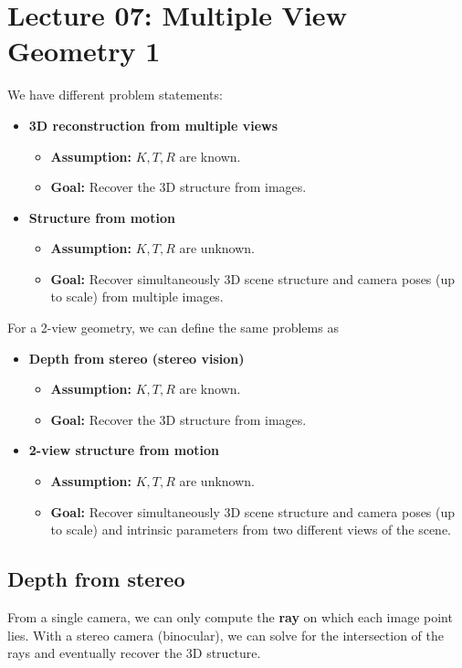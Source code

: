 \documentclass[a4paper,12 pt]{article}
\theoremstyle{definition}
\theoremstyle{remark}
\theoremstyle{definition}
\theoremstyle{definition}
\theoremstyle{definition}
\theoremstyle{remark}
\theoremstyle{definition}
\begin{document}
\newpage
\section*{Lecture 07: Multiple View Geometry 1}
We have different problem statements:
\begin{itemize}
\item \textbf{3D reconstruction from multiple views}
\begin{itemize}
\item \textbf{Assumption:} $K,T,R$ are known.
\item \textbf{Goal:} Recover the 3D structure from images.
\end{itemize}
\item \textbf{Structure from motion}
\begin{itemize}
\item \textbf{Assumption:} $K,T,R$ are unknown.
\item \textbf{Goal:} Recover simultaneously 3D scene structure and camera poses (up to scale) from multiple images.
\end{itemize}
\end{itemize}
For a 2-view geometry, we can define the same problems as
\begin{itemize}
\item \textbf{Depth from stereo (stereo vision)}
\begin{itemize}
\item \textbf{Assumption:} $K,T,R$ are known.
\item \textbf{Goal:} Recover the 3D structure from images.
\end{itemize}
\item \textbf{2-view structure from motion}
\begin{itemize}
\item \textbf{Assumption:} $K,T,R$ are unknown.
\item \textbf{Goal:} Recover simultaneously 3D scene structure and camera poses (up to scale) and intrinsic parameters from two different views of the scene.
\end{itemize}
\end{itemize}
\subsection*{Depth from stereo}
From a single camera, we can only compute the \textbf{ray} on which each image point lies. With a stereo camera (binocular), we can solve for the intersection of the rays and eventually recover the 3D structure.
\end{document}
